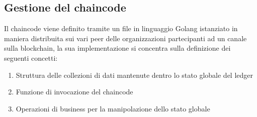 \subsection{Gestione del chaincode}
Il chaincode viene definito tramite un file in linguaggio Golang istanziato in maniera distribuita sui vari peer delle organizzazioni partecipanti ad un canale sulla blockchain, la sua implementazione si concentra sulla definizione dei seguenti concetti: 
\begin{enumerate}
    \item Struttura delle collezioni di dati mantenute dentro lo stato globale del ledger
    \item Funzione di invocazione del chaincode
    \item Operazioni di business per la manipolazione dello stato globale
\end{enumerate}
